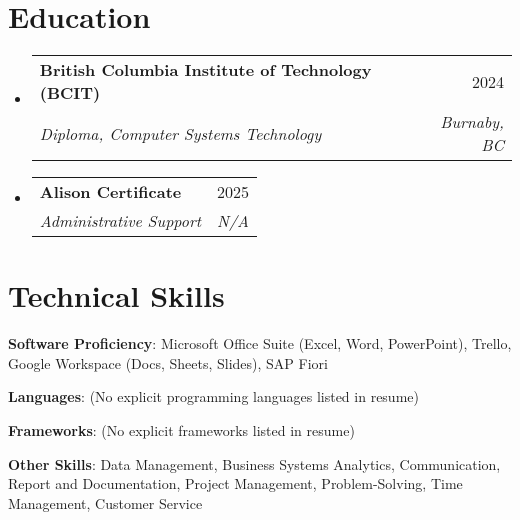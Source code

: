 \documentclass[letterpaper,11pt]{article}
\makeatletter
\newcommand{\resumeSubheading}[4]{
\vspace{-2pt}\item
\begin{tabular*}{0.97\textwidth}[t]{l@{\extracolsep{\fill}}r}
\textbf{#1} & #2 \\
\textit{\small#3} & \textit{\small #4} \\
\end{tabular*}\vspace{-7pt}
}
\newcommand{\resumeSubHeadingListStart}{\begin{itemize}[leftmargin=0.15in, label={}]}
\newcommand{\resumeSubHeadingListEnd}{\end{itemize}}
\makeatother
\begin{document}
\section{Education}
\resumeSubHeadingListStart
\resumeSubheading{British Columbia Institute of Technology (BCIT)}{2024}{Diploma, Computer Systems Technology}{Burnaby, BC}
\resumeSubheading{Alison Certificate}{2025}{Administrative Support}{N/A}
\resumeSubHeadingListEnd

\section{Technical Skills}
\begin{itemize}[leftmargin=0.15in, label={}]
\small{\item{\textbf{Software Proficiency}: Microsoft Office Suite (Excel, Word, PowerPoint), Trello, Google Workspace (Docs, Sheets, Slides), SAP Fiori}
\item{\textbf{Languages}:  (No explicit programming languages listed in resume)}
\item{\textbf{Frameworks}: (No explicit frameworks listed in resume)}
\item{\textbf{Other Skills}: Data Management, Business Systems Analytics, Communication, Report and Documentation, Project Management, Problem-Solving, Time Management, Customer Service}
}
\end{itemize}
\end{document}
